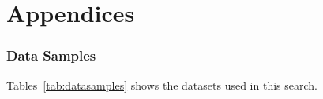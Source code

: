 \documentclass[NOTE, atlasdraft=true, texlive=2017, UKenglish]{\ATLASLATEXPATH atlasdoc}
\begin{document}
\clearpage
\appendix
\part*{Appendices}


\clearpage
\section{Data Samples}
\label{app:datasamples}

Tables~\ref{tab:datasamples} shows the datasets used in this search.
\end{document}
